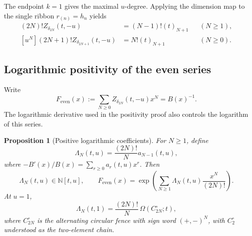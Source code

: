 \documentclass{amsart}
\newtheorem{proposition}[proposition]{Proposition}
\theoremstyle{definition}
\theoremstyle{remark}
\begin{document}
The endpoint $k=1$ gives the maximal $u$-degree.  Applying the dimension map
to the single ribbon $r_{(n)}=h_n$ yields
\begin{align}
 [u^{N-1}](2N)!Z_{\delta_{2N}}(t,-u)
 &=(N-1)!(t)_{N+1} &&(N\geq1),
 \label{eq:even-extreme-u-coefficient}\\
 [u^N](2N+1)!Z_{\delta_{2N+1}}(t,-u)
 &=N!(t)_{N+1} &&(N\geq0).
 \label{eq:odd-extreme-u-coefficient}
\end{align}

\subsection{Logarithmic positivity of the even series}

Write
\[
 F_{\mathrm{even}}(x)
 :=\sum_{N\geq0}Z_{\delta_{2N}}(t,-u)x^N
 =B(x)^{-1}.
\]
The logarithmic derivative used in the positivity proof also controls the
logarithm of this series.

\begin{proposition}[Positive logarithmic coefficients]
\label{prop:connected-circular-deformation}
For $N\geq1$, define
\begin{equation}
 \Lambda_N(t,u)=\frac{(2N)!}{N}a_{N-1}(t,u),
 \label{eq:connected-circular-polynomial}
\end{equation}
where $-B'(x)/B(x)=\sum_{r\geq0}a_r(t,u)x^r$.  Then
\begin{equation}
 \Lambda_N(t,u)\in\mathbb N[t,u],
 \qquad
 F_{\mathrm{even}}(x)
 =\exp\!\left(\sum_{N\geq1}
       \Lambda_N(t,u)\frac{x^N}{(2N)!}\right).
 \label{eq:connected-even-exponential-formula}
\end{equation}
At $u=1$,
\begin{equation}
 \Lambda_N(t,1)=\frac{(2N)!}{N}\,\Omega(C_{2N}^{\circ};t),
 \label{eq:connected-circular-specialization}
\end{equation}
where $C_{2N}^{\circ}$ is the alternating circular fence with sign word
$(+,-)^N$, with $C_2^{\circ}$ understood as the two-element chain.
\end{proposition}
\end{document}
